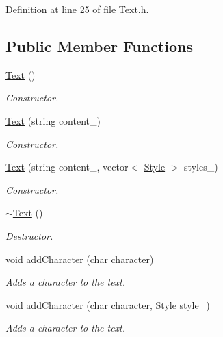 Definition at line 25 of file Text.h.\subsection*{Public Member Functions}
\begin{CompactItemize}
\item 
\hyperlink{class_text_b3e26143fccc52699bcc5149cae852bc}{Text} ()
\begin{CompactList}\small\item\em Constructor. \item\end{CompactList}\item 
\hyperlink{class_text_9363c2495337f85a6e29621a7c4e86f9}{Text} (string content\_\-)
\begin{CompactList}\small\item\em Constructor. \item\end{CompactList}\item 
\hyperlink{class_text_1b252646fc8feb154868c4138f610bfc}{Text} (string content\_\-, vector$<$ \hyperlink{class_style}{Style} $>$ styles\_\-)
\begin{CompactList}\small\item\em Constructor. \item\end{CompactList}\item 
\hyperlink{class_text_2d49e5c280e205125b149f7777ae30c7}{$\sim$Text} ()
\begin{CompactList}\small\item\em Destructor. \item\end{CompactList}\item 
void \hyperlink{class_text_f30df66d8aa08a4e202512a358534f6c}{addCharacter} (char character)
\begin{CompactList}\small\item\em Adds a character to the text. \item\end{CompactList}\item 
void \hyperlink{class_text_001de966164d34082a8712c145cebc66}{addCharacter} (char character, \hyperlink{class_style}{Style} style\_\-)
\begin{CompactList}\small\item\em Adds a character to the text. \item\end{CompactList}\item 

\end{CompactItemize}
